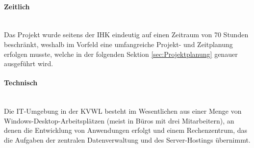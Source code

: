 \paragraph{Zeitlich} ~\\
\label{p:Randbedingungen:Zeitlich}
Das Projekt wurde seitens der IHK eindeutig auf einen Zeitraum von 70 Stunden beschränkt, weshalb im Vorfeld eine umfangreiche Projekt- und Zeitplanung erfolgen musste, welche in der folgenden Sektion \ref{sec:Projektplanung} genauer ausgeführt wird.

\paragraph{Technisch} ~\\
\label{p:Randbedingungen:Technisch}
Die IT-Umgebung in der \ac{KVWL} besteht im Wesentlichen aus einer Menge von Windows-Desktop-Arbeitsplätzen (meist in Büros mit \ca drei Mitarbeitern), an denen die Entwicklung von Anwendungen erfolgt und einem Rechenzentrum, das die Aufgaben der zentralen Datenverwaltung und des Server-Hostings übernimmt.